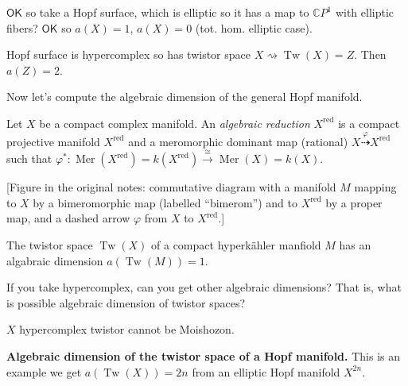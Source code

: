 $\mathsf{OK}$ so take a Hopf surface, which
is elliptic so it has a map to
$\mathbb{C}P^{1}$ with elliptic fibers?
$\mathsf{OK}$ so $a(X)=1$, $a(X)=0$ (tot.
hom. elliptic case).

\begin{theorem}[Pontecorro]
\label{theorem-tw-pontecorro}
Hopf surface is hypercomplex so has twistor
space $X\rightsquigarrow
\operatorname{Tw}(X)=Z$. Then $a(Z)=2$.
\end{theorem}

Now let's compute the algebraic dimension of
the general Hopf manifold.

\begin{definition}
\label{definition-tw-algebraic-reduction}
Let $X$ be a compact complex manifold. An
{\it algebraic reduction}
$X^{\operatorname{red}}$ is a compact
projective manifold $X^{\operatorname{red}}$
and a meromorphic dominant map (rational) $X
\overset{\varphi}{\dashrightarrow}
X^{\operatorname{red}}$
such that $\varphi^*
:\operatorname{Mer}(X^{\operatorname{red}})=
k(X^{\operatorname{red}})\overset{\cong
}{\longrightarrow}\operatorname{Mer}(X)=
k(X)$.

[Figure in the original notes: commutative
diagram with a manifold $M$ mapping to $X$ by
a bimeromorphic map (labelled ``bimerom'')
and to $X^{\operatorname{red}}$ by a proper
map, and a dashed arrow $\varphi$ from $X$ to
$X^{\operatorname{red}}$.]
\end{definition}

\begin{theorem}[Verbitsky]
\label{theorem-tw-verbitsky-adim}
The twistor space $\operatorname{Tw}(X)$ of a
compact hyperkähler manfiold $M$ has an
algabraic dimension
$a(\operatorname{Tw}(M))=1$.
\end{theorem}

\begin{remark}[Question]
\label{remark-tw-question-adim}
If you take hypercomplex, can you get other
algebraic dimensions? That is, what is
possible algebraic dimension of twistor
spaces?
\end{remark}

\begin{theorem}
\label{theorem-tw-not-moishezon}
$X$ hypercomplex twistor cannot be Moishozon.
\end{theorem}

\medskip\noindent
{\bf Algebraic dimension of the twistor space
of a Hopf manifold.}
This is an example we get
$a(\operatorname{Tw}(X))=2n$ from an elliptic
Hopf manifold $X^{2n}.$

